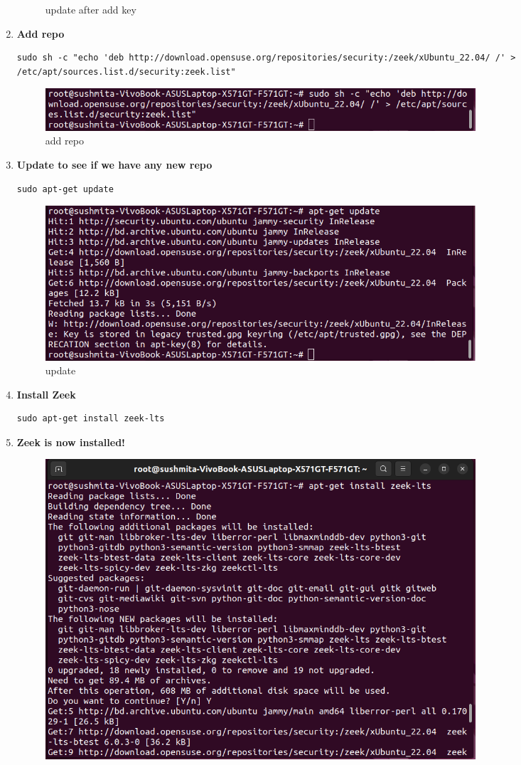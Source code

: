 \begin{enumerate}
\begin{figure}[H]
  \caption{update after add key}
\end{figure}
  \item \textbf{Add repo}
    \begin{lstlisting}[style=bashstyle]
      sudo sh -c "echo 'deb http://download.opensuse.org/repositories/security:/zeek/xUbuntu_22.04/ /' > /etc/apt/sources.list.d/security:zeek.list"
    \end{lstlisting}
    \begin{figure}[H]
  \centering
  \includegraphics[width=0.8\textwidth]{images/install/9_add_repo.png}
  \caption{add repo}
\end{figure}
  \item \textbf{Update to see if we have any new repo}
    \begin{lstlisting}[style=bashstyle]
      sudo apt-get update
    \end{lstlisting}
    \begin{figure}[H]
  \centering
  \includegraphics[width=0.8\textwidth]{images/install/10_update_to_see_new_repo.png}
  \caption{update}
\end{figure}
  \item \textbf{Install Zeek}
    \begin{lstlisting}[style=bashstyle]
      sudo apt-get install zeek-lts
    \end{lstlisting}
  \item \textbf{Zeek is now installed!}
  \begin{figure}[H]
  \centering
  \includegraphics[width=0.8\textwidth]{images/install/11_install_zeek.png}

\end{figure}
\end{enumerate}
